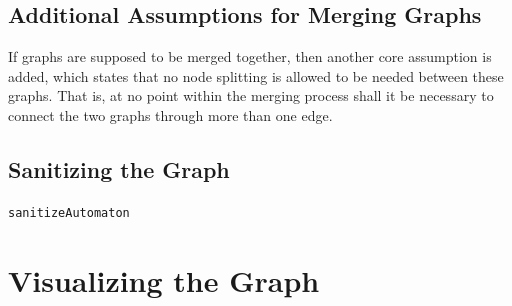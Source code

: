 \documentclass[a4paper,12pt,twoside,BCOR=10mm]{scrbook}
\begin{document}
\subsection{Additional Assumptions for Merging Graphs}

If graphs are supposed to be merged together, then another core assumption is added, 
which states that no node splitting is allowed to be needed between these graphs. 
That is, at no point within the merging process shall it be necessary to 
connect the two graphs through more than one edge.


\subsection{Sanitizing the Graph}

\texttt{sanitizeAutomaton}

\section{Visualizing the Graph}
%
\end{document}
